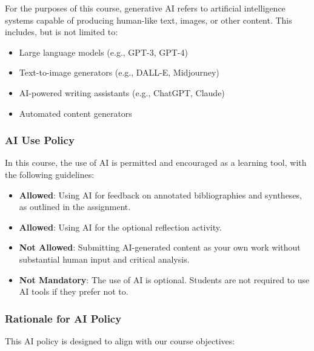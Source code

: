 \documentclass[12pt, letterpaper]{article}
\begin{document}
\noindent For the purposes of this course, generative AI refers to artificial intelligence systems capable of producing human-like text, images, or other content. This includes, but is not limited to:

\begin{itemize}
    \item Large language models (e.g., GPT-3, GPT-4)
    \item Text-to-image generators (e.g., DALL-E, Midjourney)
    \item AI-powered writing assistants (e.g., ChatGPT, Claude)
    \item Automated content generators
\end{itemize}

\subsubsection*{AI Use Policy}

In this course, the use of AI is permitted and encouraged as a learning tool, with the following guidelines:

\begin{itemize}
    \item \textbf{Allowed}: Using AI for feedback on annotated bibliographies and syntheses, as outlined in the assignment.
    \item \textbf{Allowed}: Using AI for the optional reflection activity.
    \item \textbf{Not Allowed}: Submitting AI-generated content as your own work without substantial human input and critical analysis.
    \item \textbf{Not Mandatory}: The use of AI is optional. Students are not required to use AI tools if they prefer not to.
\end{itemize}

\subsubsection*{Rationale for AI Policy}

This AI policy is designed to align with our course objectives:
\end{document}
